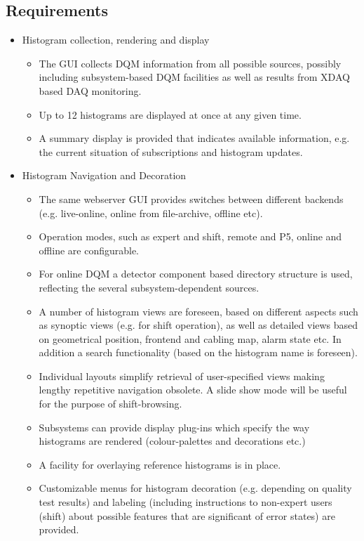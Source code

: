 \subsection{Requirements}

\begin{itemize}
\item Histogram collection, rendering and display
\begin{itemize}       
   \item The GUI collects DQM information from all possible sources, possibly including subsystem-based DQM facilities as well as results from XDAQ based DAQ monitoring. 
   \item Up to 12 histograms are displayed at once at any given time. 
   \item A summary display is provided that indicates available information, e.g. the current situation of subscriptions and histogram updates.
\end{itemize}
\item Histogram Navigation and Decoration 
\begin{itemize}
\item The same webserver GUI provides switches between different backends (e.g. live-online, online from file-archive, offline etc).
\item Operation modes, such as expert and shift, remote and P5, online and offline are configurable.
\item For online DQM a detector component based directory structure is used, reflecting the several subsystem-dependent sources.
\item A number of histogram views are foreseen, based on different aspects such as synoptic views (e.g. for shift operation), as well as detailed views based on geometrical position, frontend and cabling map, alarm state etc. In addition a search functionality (based on the histogram name is foreseen).
\item Individual layouts simplify retrieval of user-specified views making lengthy repetitive navigation obsolete. A slide show mode will be useful for the purpose of shift-browsing.
\item Subsystems can provide display plug-ins which specify the way histograms are rendered (colour-palettes and decorations etc.)
\item A facility for overlaying reference histograms is in place.
\item Customizable menus for histogram decoration (e.g. depending on quality test results) and labeling (including instructions to non-expert users (shift) about possible features that are significant of error states) are provided.

\end{itemize}
\end{itemize}
